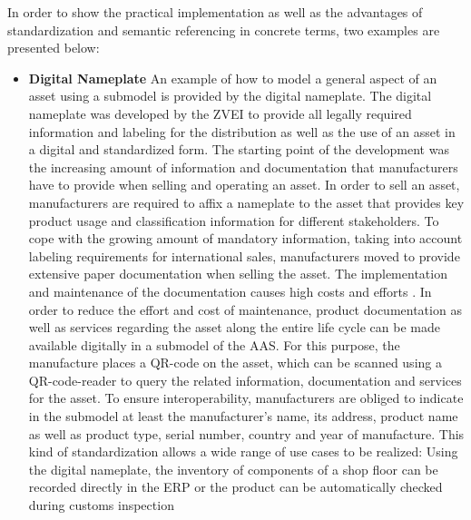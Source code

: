 In order to show the practical implementation as well as the advantages of standardization and semantic referencing in concrete terms, two examples are presented below:

\begin{itemize}

    \item [] \textbf{Digital Nameplate} An example of how to model a general aspect of an asset using a submodel is provided by the digital nameplate. The digital nameplate was developed by the \ac{ZVEI} to provide all legally required information and labeling for the distribution as well as the use of an asset in a digital and standardized form. The starting point of the development was the increasing amount of information and documentation that manufacturers have to provide when selling and operating an asset. In order to sell an asset, manufacturers are required to affix a nameplate to the asset that provides key product usage and classification information for different stakeholders. To cope with the growing amount of mandatory information, taking into account labeling requirements for international sales, manufacturers moved to provide extensive paper documentation when selling the asset. The implementation and maintenance of the documentation causes high costs and efforts \cite[p. 1]{ZVEI2020DasVernetzt}. In order to reduce the effort and cost of maintenance, product documentation as well as services regarding the asset along the entire life cycle can be made available digitally in a submodel of the \ac{AAS}. For this purpose, the manufacture places a QR-code on the asset, which can be scanned using a QR-code-reader to query the related information, documentation and services for the asset. To ensure interoperability, manufacturers are obliged to indicate in the submodel at least the manufacturer's name, its address, product name as well as product type, serial number, country and year of manufacture. This kind of standardization allows a wide range of use cases to be realized: Using the digital nameplate, the inventory of components of a shop floor can be recorded directly in the \ac{ERP} or the product can be automatically checked during customs inspection \cite[p. 4]{ZVEI2020DasVernetzt}
    

\end{itemize}
